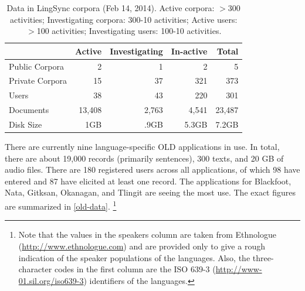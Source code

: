 \documentclass[11pt]{article}
\begin{document}
\begin{table}[h]
\begin{center}
\scriptsize
\begin{tabular}{lrrrr}
      \toprule
                     ~ &  Active & Investigating & In-active & Total\\
      \midrule
      Public Corpora  &       2 &   1 &   2 & 5 \\ 
      Private Corpora &      15 &  37 & 321 & 373\\ 
      Users           &      38 &  43 & 220 & 301 \\
      Documents & 13,408 & 2,763 & 4,541 &23,487\\
      Disk Size & 1GB & .9GB & 5.3GB& 7.2GB\\
      
      \bottomrule

\end{tabular}
\caption{Data in LingSync corpora (Feb 14, 2014). Active corpora: $>$300
activities; Investigating corpora: 300-10 activities; Active users: $>$100
activities; Investigating users: 100-10 activities.}
\label{lingsync-data}
 \end{center}
 \normalsize
\end{table}


There are currently nine language-specific OLD applications in use. In total,
there are about 19,000 records (primarily sentences), 300 texts, and 20 GB of
audio files.  There are 180 registered users across all applications, of which
98 have entered and 87 have elicited at least one record. The applications for
Blackfoot, Nata, Gitksan, Okanagan, and Tlingit are seeing the most use. The
exact figures are summarized in \autoref{old-data}.%
\footnote{ Note that the values in the speakers column are taken from
    Ethnologue (\url{http://www.ethnologue.com}) and are provided only to give
    a rough indication of the speaker populations of the languages. Also, the
    three-character codes in the first column are the ISO 639-3
(\url{http://www-01.sil.org/iso639-3}) identifiers of the languages.}
\end{document}
